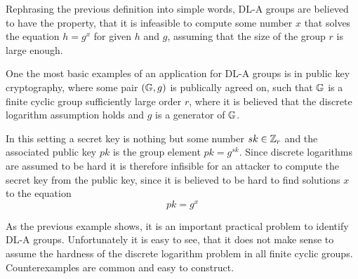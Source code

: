 Rephrasing the previous definition into simple words, DL-A groups are believed to have the property, that it is infeasible to compute some number $x$ that solves the equation $h=g^x$ for given $h$ and $g$, assuming that the size of the group $r$ is large enough.
\begin{example}
One the most basic examples of an application for DL-A groups is in public key cryptography, where some pair $(\mathbb{G},g)$ is publically agreed on, such that $\mathbb{G}$ is a finite cyclic group sufficiently large order $r$, where it is believed that the discrete logarithm assumption holds and $g$ is a generator of $\mathbb{G}$.

In this setting a secret key is nothing but some number $sk\in \mathbb{Z}_r$ and the associated public key $pk$ is the group element $pk=g^{sk}$. Since discrete logarithms are assumed to be hard it is therefore infisible for an attacker to compute the secret key from the public key, since it is believed to be hard to find solutions $x$ to the equation 
$$
pk = g^{x}
$$ 
\end{example}
As the previous example shows, it is an important practical problem to identify DL-A groups. Unfortunately it is easy to see, that it does not make sense to assume the hardness of the discrete logarithm problem in all finite cyclic groups. Counterexamples are common and easy to construct. 
